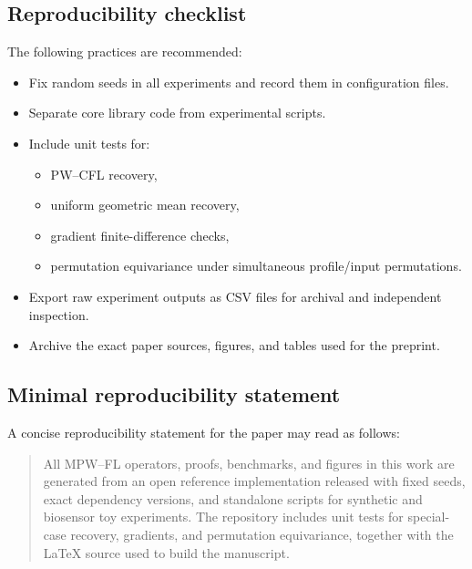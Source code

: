 \documentclass[11pt]{article}
\begin{document}
\subsection{Reproducibility checklist}

The following practices are recommended:
\begin{itemize}
  \item Fix random seeds in all experiments and record them in configuration files.
  \item Separate core library code from experimental scripts.
  \item Include unit tests for:
  \begin{itemize}
    \item PW--CFL recovery,
    \item uniform geometric mean recovery,
    \item gradient finite-difference checks,
    \item permutation equivariance under simultaneous profile/input permutations.
  \end{itemize}
  \item Export raw experiment outputs as CSV files for archival and independent inspection.
  \item Archive the exact paper sources, figures, and tables used for the preprint.
\end{itemize}

\subsection{Minimal reproducibility statement}

A concise reproducibility statement for the paper may read as follows:

\begin{quote}
All MPW--FL operators, proofs, benchmarks, and figures in this work are generated from an open reference implementation released with fixed seeds, exact dependency versions, and standalone scripts for synthetic and biosensor toy experiments. The repository includes unit tests for special-case recovery, gradients, and permutation equivariance, together with the \LaTeX{} source used to build the manuscript.
\end{quote}

\nocite{*}
  
  
\end{document}
